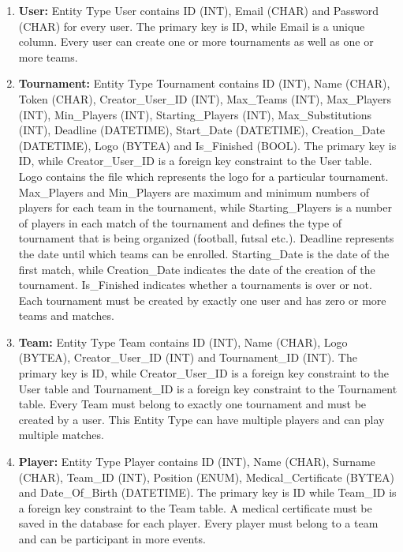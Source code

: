 \begin{enumerate}
    \item \textbf{User:} Entity Type User contains ID (INT), Email (CHAR) and Password (CHAR) for every user. The primary key is ID, while Email is a unique column. Every user can create one or more
    tournaments as well as one or more teams.
    
    \item \textbf{Tournament:} Entity Type Tournament contains ID (INT), Name (CHAR), Token (CHAR), Creator\_User\_ID (INT), Max\_Teams (INT), Max\_Players (INT), Min\_Players (INT),
    Starting\_Players (INT), Max\_Substitutions (INT), Deadline (DATETIME), Start\_Date (DATETIME), Creation\_Date (DATETIME), Logo (BYTEA) and Is\_Finished (BOOL). The primary key is ID,
    while Creator\_User\_ID is a foreign key constraint to the User table. Logo contains the file which represents the logo for a particular tournament. Max\_Players and
    Min\_Players are maximum and minimum numbers of players for each team in the tournament, while Starting\_Players is a number of players in each match of the tournament and defines the type of
    tournament that is being organized (football, futsal etc.). Deadline represents the date until which teams can be enrolled. Starting\_Date is the date of the first match, while Creation\_Date
    indicates the date of the creation of the tournament. Is\_Finished indicates whether a tournaments is over or not. Each tournament must be created by exactly one user and has zero or more teams
    and matches.
    
    \item \textbf{Team:} Entity Type Team contains ID (INT), Name (CHAR), Logo (BYTEA), Creator\_User\_ID (INT) and Tournament\_ID (INT). The primary key is ID, while
    Creator\_User\_ID is a foreign key constraint to the User table and Tournament\_ID is a foreign key constraint to the Tournament table. Every Team must belong to exactly one tournament and
    must be created by a user. This Entity Type can have multiple players and can play multiple matches.

    \item \textbf{Player:} Entity Type Player contains ID (INT), Name (CHAR), Surname (CHAR), Team\_ID (INT), Position (ENUM), Medical\_Certificate (BYTEA) and Date\_Of\_Birth (DATETIME).
    The primary key is ID while Team\_ID is a foreign key constraint to the Team table. A medical certificate must be saved in the database for each player.
    Every player must belong to a team and can be participant in more events.


\end{enumerate}
